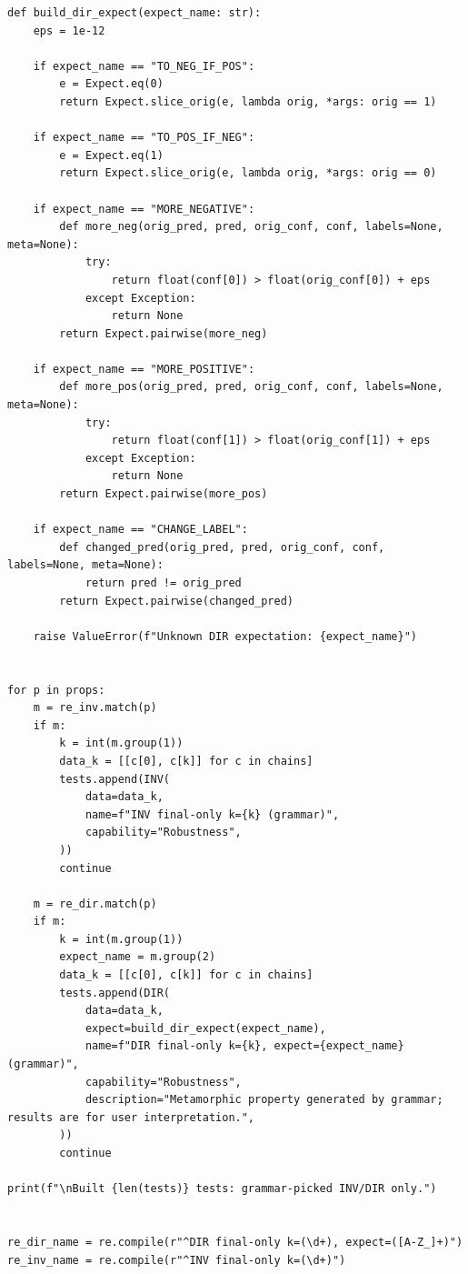 \documentclass[11pt]{article}
\begin{document}
\begin{lstlisting}
def build_dir_expect(expect_name: str):
    eps = 1e-12

    if expect_name == "TO_NEG_IF_POS":
        e = Expect.eq(0)
        return Expect.slice_orig(e, lambda orig, *args: orig == 1)

    if expect_name == "TO_POS_IF_NEG":
        e = Expect.eq(1)
        return Expect.slice_orig(e, lambda orig, *args: orig == 0)

    if expect_name == "MORE_NEGATIVE":
        def more_neg(orig_pred, pred, orig_conf, conf, labels=None, meta=None):
            try:
                return float(conf[0]) > float(orig_conf[0]) + eps
            except Exception:
                return None
        return Expect.pairwise(more_neg)

    if expect_name == "MORE_POSITIVE":
        def more_pos(orig_pred, pred, orig_conf, conf, labels=None, meta=None):
            try:
                return float(conf[1]) > float(orig_conf[1]) + eps
            except Exception:
                return None
        return Expect.pairwise(more_pos)

    if expect_name == "CHANGE_LABEL":
        def changed_pred(orig_pred, pred, orig_conf, conf, labels=None, meta=None):
            return pred != orig_pred
        return Expect.pairwise(changed_pred)

    raise ValueError(f"Unknown DIR expectation: {expect_name}")


for p in props:
    m = re_inv.match(p)
    if m:
        k = int(m.group(1))
        data_k = [[c[0], c[k]] for c in chains]
        tests.append(INV(
            data=data_k,
            name=f"INV final-only k={k} (grammar)",
            capability="Robustness",
        ))
        continue

    m = re_dir.match(p)
    if m:
        k = int(m.group(1))
        expect_name = m.group(2)
        data_k = [[c[0], c[k]] for c in chains]
        tests.append(DIR(
            data=data_k,
            expect=build_dir_expect(expect_name),
            name=f"DIR final-only k={k}, expect={expect_name} (grammar)",
            capability="Robustness",
            description="Metamorphic property generated by grammar; results are for user interpretation.",
        ))
        continue

print(f"\nBuilt {len(tests)} tests: grammar-picked INV/DIR only.")


re_dir_name = re.compile(r"^DIR final-only k=(\d+), expect=([A-Z_]+)")
re_inv_name = re.compile(r"^INV final-only k=(\d+)")


\end{lstlisting}
\end{document}
